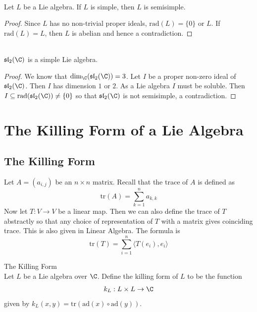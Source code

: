 \documentclass[a4paper]{article}
\begin{document}
\begin{lmm}{}{} \\Let $L$ be a Lie algebra. If $L$ is simple, then $L$ is semisimple. 
\begin{proof}
Since $L$ has no non-trivial proper ideals, $\text{rad}(L)=\{0\}$ or $L$. If $\text{rad}(L)=L$, then $L$ is abelian and hence a contradiction. 
\end{proof}
\end{lmm}

\begin{eg}{}{} \\$\mathfrak{sl}_2(\C)$ is a simple Lie algebra. 
\begin{proof}
We know that $\dim_\C(\mathfrak{sl}_2(\C))=3$. Let $I$ be a proper non-zero ideal of $\mathfrak{sl}_2(\C)$. Then $I$ has dimension $1$ or $2$. As a Lie algebra $I$ must be soluble. Then $I\subseteq\text{rad}(\mathfrak{sl}_2(\C))\neq\{0\}$ so that $\mathfrak{sl}_2(\C)$ is not semisimple, a contradiction. 
\end{proof}
\end{eg}

\pagebreak
\section{The Killing Form of a Lie Algebra}
\subsection{The Killing Form}
Let $A=(a_{i,j})$ be an $n\times n$ matrix. Recall that the trace of $A$ is defined as $$\text{tr}(A)=\sum_{k=1}^na_{k,k}$$ Now let $T:V\to V$ be a linear map. Then we can also define the trace of $T$ abstractly so that any choice of representation of $T$ with a matrix gives coinciding trace. This is also given in Linear Algebra. The formula is $$\text{tr}(T)=\sum_{i=1}^n\langle T(e_i),e_i\rangle$$

\begin{defn}{The Killing Form}{} \\Let $L$ be a Lie algebra over $\C$. Define the killing form of $L$ to be the function $$k_L:L\times L\to\C$$ given by $k_L(x,y)=\text{tr}(\text{ad}(x)\circ\text{ad}(y))$. 
\end{defn}
\end{document}
